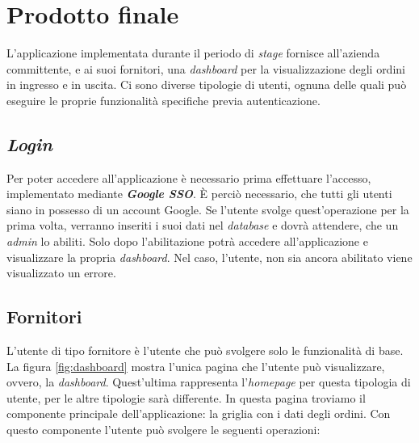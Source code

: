 \section{Prodotto finale}
L'applicazione implementata durante il periodo di \emph{stage} fornisce all'azienda committente, e ai suoi fornitori, una \emph{dashboard} per la visualizzazione degli ordini in ingresso e in uscita.
Ci sono diverse tipologie di utenti, ognuna delle quali può eseguire le proprie funzionalità specifiche previa autenticazione. 

\subsection{\emph{Login}}
Per poter accedere all'applicazione è necessario prima effettuare l'accesso, implementato mediante \emph{\textbf{Google SSO}}. 
È perciò necessario, che tutti gli utenti siano in possesso di un account Google.
Se l'utente svolge quest'operazione per la prima volta, verranno inseriti i suoi dati nel \emph{database} e dovrà attendere, che un \emph{admin} lo abiliti.
Solo dopo l'abilitazione potrà accedere all'applicazione e visualizzare la propria \emph{dashboard}. 
Nel caso, l'utente, non sia ancora abilitato viene visualizzato un errore.

\subsection{Fornitori}
L'utente di tipo fornitore è l'utente che può svolgere solo le funzionalità di base.
La figura \ref{fig:dashboard} mostra l'unica pagina che l'utente può visualizzare, ovvero, la \emph{dashboard}.
Quest'ultima rappresenta l'\emph{homepage} per questa tipologia di utente, per le altre tipologie sarà differente.
In questa pagina troviamo il componente principale dell'applicazione: la griglia con i dati degli ordini.
Con questo componente l'utente può svolgere le seguenti operazioni:

